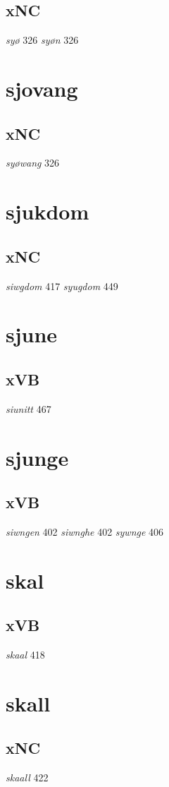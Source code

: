 \documentclass[a4paper,twocolumn]{article}
\begin{document}
\subsection{xNC}
\label{sec:org41ce035}
\emph{syø} 326 \emph{syøn} 326 
\section{sjovang}
\label{sec:org5a954dd}
\subsection{xNC}
\label{sec:orge5a3631}
\emph{syøwang} 326 
\section{sjukdom}
\label{sec:org01c9ad9}
\subsection{xNC}
\label{sec:org60f9014}
\emph{siwgdom} 417 \emph{syugdom} 449 
\section{sjune}
\label{sec:org6ead690}
\subsection{xVB}
\label{sec:org9e32393}
\emph{siunitt} 467 
\section{sjunge}
\label{sec:orgfb0c53b}
\subsection{xVB}
\label{sec:org49bde82}
\emph{siwngen} 402 \emph{siwnghe} 402 \emph{sywnge} 406 
\section{skal}
\label{sec:org094b02d}
\subsection{xVB}
\label{sec:org452bf1d}
\emph{skaal} 418 
\section{skall}
\label{sec:org9a6e619}
\subsection{xNC}
\label{sec:orgfb54892}
\emph{skaall} 422 
\end{document}

